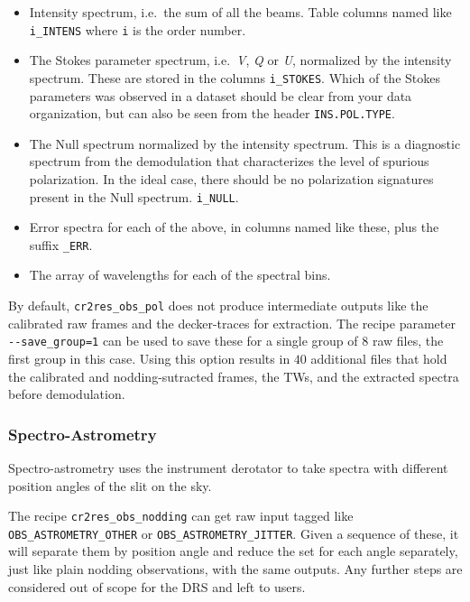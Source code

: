 \begin{itemize}
    \item Intensity spectrum, i.e.~the sum of all the beams. Table columns named like \verb!i_INTENS! where \verb!i! is the order number.
    \item The Stokes parameter spectrum, i.e.~\textit{V}, \textit{Q} or \textit{U}, normalized by the intensity spectrum. These are stored in the columns \verb!i_STOKES!. Which of the Stokes parameters was observed in a dataset should be clear from your data organization, but can also be seen from the header \verb!INS.POL.TYPE!.
    \item The Null spectrum normalized by the intensity spectrum. This is a diagnostic spectrum from the demodulation that characterizes the level of spurious polarization. In the ideal case, there should be no polarization signatures present in the Null spectrum. \verb!i_NULL!.
    \item Error spectra for each of the above, in columns named like these, plus the suffix \verb!_ERR!.
    \item The array of wavelengths for each of the spectral bins.
\end{itemize}

By default, \verb!cr2res_obs_pol! does not produce intermediate outputs like the
calibrated raw frames and the decker-traces for extraction. The recipe parameter
\verb!--save_group=1! can be used to save these for a single group of $8$ raw
files, the first group in this case. Using this option results in $40$
additional files that hold the calibrated and nodding-sutracted frames, the TWs,
and the extracted spectra before demodulation.

\subsubsection{Spectro-Astrometry}

Spectro-astrometry uses the instrument derotator to take spectra with different
position angles of the slit on the sky.

The recipe \verb!cr2res_obs_nodding! can get raw input tagged like
\verb!OBS_ASTROMETRY_OTHER! or \linebreak\verb!OBS_ASTROMETRY_JITTER!. Given a
sequence of these, it will separate them by position angle and reduce the set
for each angle separately, just like plain nodding observations, with the same
outputs. Any further steps are considered out of scope for the DRS and left to
users.

